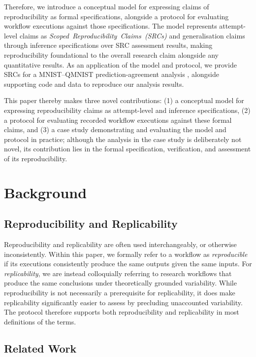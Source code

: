 \documentclass[conference,a4paper]{IEEEtran}
\begin{document}
Therefore, we introduce a conceptual model for expressing claims of reproducibility as formal specifications, alongside a protocol for evaluating workflow executions against those specifications. The model represents attempt-level claims as \emph{Scoped~Reproducibility~Claims~(SRCs)} and generalisation claims through inference specifications over SRC assessment results, making reproducibility foundational to the overall research claim alongside any quantitative results. As an application of the model and protocol, we provide SRCs for a MNIST--QMNIST prediction-agreement analysis \autocite{yadav2019qmnist}, alongside supporting code and data \cite{sluitman2026src} to reproduce our analysis results.

This paper thereby makes three novel contributions: (1) a conceptual model for expressing reproducibility claims as attempt-level and inference specifications, (2) a protocol for evaluating recorded workflow executions against these formal claims, and (3) a case study demonstrating and evaluating the model and protocol in practice; although the analysis in the case study is deliberately not novel, its contribution lies in the formal specification, verification, and assessment of its reproducibility.

\section{Background}

  \subsection{Reproducibility and Replicability}

  Reproducibility and replicability are often used interchangeably, or otherwise inconsistently. Within this paper, we formally refer to a workflow as \emph{reproducible} if its executions consistently produce the same outputs given the same inputs. For \emph{replicability}, we are instead colloquially referring to research workflows that produce the same conclusions under theoretically grounded variability. While reproducibility is not necessarily a prerequisite for replicability, it does make replicability significantly easier to assess by precluding unaccounted variability. The protocol therefore supports both reproducibility and replicability in most definitions of the terms.

  \subsection{Related Work}
\end{document}

